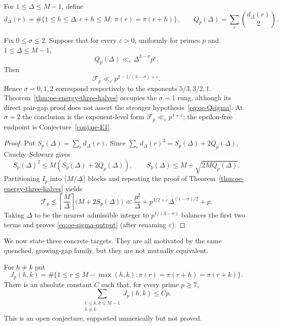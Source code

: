For $1\le\Delta\le M-1$, define
\[
 d_\Delta(r)=\#\{1\le h\le\Delta:r+h\le M,
                  \ \pi(r)=\pi(r+h)\},
 \qquad
 Q_p(\Delta)=\sum_r\binom{d_\Delta(r)}2.
\]

\begin{proposition}\label{prop:oe-sigma-machine}
Fix $0\le\sigma\le2$.  Suppose that for every $\varepsilon>0$, uniformly
for primes $p$ and $1\le\Delta\le M-1$,
\begin{equation}\label{eq:oe-Qsigma}
 Q_p(\Delta)\ll_\varepsilon
 \Delta^{3-\sigma}p^\varepsilon.
\end{equation}
Then
\begin{equation}\label{eq:oe-sigma-output}
 \mathcal F_p\ll_\varepsilon
 p^{2-1/(3-\sigma)+\varepsilon}.
\end{equation}
Hence $\sigma=0,1,2$ correspond respectively to the exponents
$5/3,3/2,1$.  Theorem~\ref{thm:oe-energy-three-halves} occupies the
$\sigma=1$ rung, although its direct pair-gap proof does not assert the
stronger hypothesis~\eqref{eq:oe-Qsigma}.  At $\sigma=2$ the conclusion is
the exponent-level form $\mathcal F_p\ll_\varepsilon p^{1+\varepsilon}$;
the epsilon-free endpoint is Conjecture~\ref{conj:oe-E1}.
\end{proposition}

\begin{proof}
Put $S_p(\Delta)=\sum_rd_\Delta(r)$.  Since
$\sum_rd_\Delta(r)^2=S_p(\Delta)+2Q_p(\Delta)$, Cauchy--Schwarz gives
\[
 S_p(\Delta)^2\le M(S_p(\Delta)+2Q_p(\Delta)),
 \qquad
 S_p(\Delta)\le M+\sqrt{2MQ_p(\Delta)}.
\]
Partitioning $I_p$ into $\lceil M/\Delta\rceil$ blocks and repeating the
proof of Theorem~\ref{thm:oe-energy-three-halves} yields
\[
 \mathcal F_p\le
 \left\lceil\frac M\Delta\right\rceil
 \bigl(M+2S_p(\Delta)\bigr)
 \ll \frac{p^2}{\Delta}
 +p^{3/2+\varepsilon}\Delta^{(1-\sigma)/2}+p.
\]
Taking $\Delta$ to be the nearest admissible integer to
$p^{1/(3-\sigma)}$ balances the first two terms and proves
\eqref{eq:oe-sigma-output} (after renaming $\varepsilon$).
\end{proof}

We now state three concrete targets.  They are all motivated by the same
quenched, growing-gap family, but they are not mutually equivalent.

\begin{conjecture}
\label{conj:oe-ATR}
For $h\ne k$ put
\[
 J_p(h,k)=\#\{1\le r\le M-\max(h,k):
 \pi(r)=\pi(r+h)=\pi(r+k)\}.
\]
There is an absolute constant $C$ such that, for every prime $p\ge7$,
\begin{equation}\label{eq:oe-ATR}
 \sum_{\substack{1\le h,k\le M-1\\h\ne k}}J_p(h,k)\le Cp.
\end{equation}
This is an open conjecture, supported numerically but not proved.
\end{conjecture}

